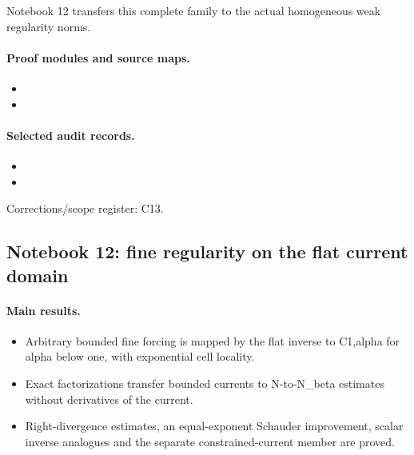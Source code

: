 Notebook 12 transfers this complete family to the actual homogeneous weak regularity norms.

\paragraph{Proof modules and source maps.}
\begingroup\small
\begin{itemize}
\item {}
\item {}
\end{itemize}
\endgroup

\paragraph{Selected audit records.}
\begingroup\small
\begin{itemize}
\item {}
\item {}
\end{itemize}
\endgroup
Corrections/scope register: C13.\par

\subsection{Notebook 12: fine regularity on the flat current domain}
\label{hnc-12}
\noindent{}\par

\paragraph{Main results.}
\begin{itemize}
\item Arbitrary bounded fine forcing is mapped by the flat inverse to C1,alpha for alpha below one, with exponential cell locality.
\item Exact factorizations transfer bounded currents to N-to-N\_beta estimates without derivatives of the current.
\item Right-divergence estimates, an equal-exponent Schauder improvement, scalar inverse analogues and the separate constrained-current member are proved.
\end{itemize}

